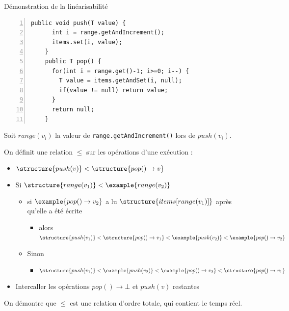 
\begingroup

\begin{frame}[fragile]{Démonstration de la linéarisabilité}

  \begin{lstlisting}[numbers=left, gobble=4]
    public void push(T value) {
      int i = range.getAndIncrement();
      items.set(i, value);
    }
    public T pop() {
      for(int i = range.get()-1; i>=0; i--) {
        T value = items.getAndSet(i, null);
        if(value != null) return value;
      }
      return null;
    }
  \end{lstlisting}
  
  Soit $range(v_i)$ la valeur de \lstinline{range.getAndIncrement()} lors de $push(v_i)$.

  On définit une relation $\le$ sur les opérations d'une exécution :
  \begin{itemize}
  \item $\structure{push(v)} < \structure{pop()\rightarrow v}$
  \item Si $\structure{range(v_1)} < \example{range(v_2)}$
    \begin{itemize}
    \item si $\example{pop() \rightarrow v_2}$ a lu $\structure{items[range(v_1)]}$ après qu'elle a été écrite
      \begin{itemize}
      \item alors $\structure{push(v_1)} < \structure{pop()\rightarrow v_1} < \example{push(v_2)} < \example{pop()\rightarrow v_2}$
      \end{itemize}
    \item Sinon
      \begin{itemize}
      \item $\structure{push(v_1)} < \example{push(v_2)} < \example{pop()\rightarrow v_2} < \structure{pop()\rightarrow v_1}$
      \end{itemize}
    \end{itemize}
  \item Intercaller les opérations $pop()\rightarrow \bot$ et $push(v)$ restantes
  \end{itemize}
  On démontre que $\le$ est une relation d'ordre totale, qui contient le temps réel. 
  
\end{frame}

\endgroup
\endinput

